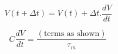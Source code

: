 			\begin{equation}
				V(t+\Delta t) = V(t) + \Delta t . \frac{dV}{dt}
			\end{equation}
		
			\begin{equation}
				C \frac{dV}{dt} = \frac{(\text{terms as shown})}{\tau_m}
			\end{equation}
		
		
			
			
			
			
			
			
			
			
			
			
			
			
			
			
			
			
			
			
			
			
			
			





